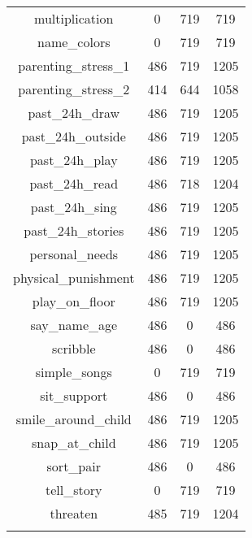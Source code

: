 \begin{table}[!htbp]
\begin{tabular}{@{\extracolsep{5pt}} cccc}
multiplication &   0 & 719 &  719 \\ 
name\_colors &   0 & 719 &  719 \\ 
parenting\_stress\_1 & 486 & 719 & 1205 \\ 
parenting\_stress\_2 & 414 & 644 & 1058 \\ 
past\_24h\_draw & 486 & 719 & 1205 \\ 
past\_24h\_outside & 486 & 719 & 1205 \\ 
past\_24h\_play & 486 & 719 & 1205 \\ 
past\_24h\_read & 486 & 718 & 1204 \\ 
past\_24h\_sing & 486 & 719 & 1205 \\ 
past\_24h\_stories & 486 & 719 & 1205 \\ 
personal\_needs & 486 & 719 & 1205 \\ 
physical\_punishment & 486 & 719 & 1205 \\ 
play\_on\_floor & 486 & 719 & 1205 \\ 
say\_name\_age & 486 &   0 &  486 \\ 
scribble & 486 &   0 &  486 \\ 
simple\_songs &   0 & 719 &  719 \\ 
sit\_support & 486 &   0 &  486 \\ 
smile\_around\_child & 486 & 719 & 1205 \\ 
snap\_at\_child & 486 & 719 & 1205 \\ 
sort\_pair & 486 &   0 &  486 \\ 
tell\_story &   0 & 719 &  719 \\ 
threaten & 485 & 719 & 1204 \\ 
\hline \\[-1.8ex] 
\end{tabular} 
\end{table} 

